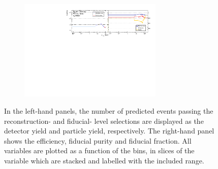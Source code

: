 \begin{figure}[htb]
\begin{subfigure}{.99\textwidth}
    \end{subfigure}
    \begin{subfigure}{.99\textwidth}\centering
        \includegraphics[width = 0.75\textwidth]{Figures/m4l/UnfoldingStudies/v014_inputs/pt12_m4loffshellinputs.pdf}
    \end{subfigure}
    \caption{In the left-hand panels, the number of predicted events passing the reconstruction- and fiducial- level selections are displayed as the detector yield and particle yield, respectively. The right-hand panel shows the efficiency, fiducial purity and fiducial fraction. All variables are plotted as a function of the \ptZOne bins, in slices of the \mFourL variable which are stacked and labelled with the included \mFourL range.
    \label{fig:ptZ1unf}}
\end{figure}  

\FloatBarrier
\clearpage

